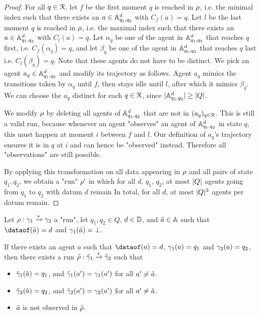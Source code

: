 \begin{proof}
For all $q \in \mathcal{R}$, 
let $f$ be the first moment $q$ is reached in $\rho$, 
i.e. the minimal index such that there exists an $a\in \mathbb{A}^d_{q_1, q_2}$
with $C_f(a)=q$.
Let $l$ be the last moment $q$ is reached in $\rho$, 
i.e. the maximal index such that there exists an $a\in \mathbb{A}^d_{q_1, q_2}$
with $C_l(a)=q$.
Let $\alpha_q$ be one of the agent in $\mathbb{A}^d_{q_1, q_2}$ that reaches $q$ first,
i.e. $C_f(\alpha_q)=q$, and 
let $\beta_q$ be one of the agent in $\mathbb{A}^d_{q_1, q_2}$ that reaches $q$ last
i.e. $C_l(\beta_q)=q$. 
Note that these agents do not have to be distinct.
We pick an agent $a_q \in \mathbb{A}^d_{q_1, q_2}$ and modify its trajectory as follows.
Agent $a_q$ mimics the transitions taken by $\alpha_q$ until $f$, 
then stays idle until $l$, after which it mimics $\beta_q$. 
We can choose the $a_q$ distinct for each $q\in \mathcal{R}$, since $|\mathbb{A}^d_{q_1, q_2}| \geq |Q|$.

We modify $\rho$ by deleting all agents of $\mathbb{A}^d_{q_1, q_2}$ that are not in $(a_q)_{q \in \mathcal{R}}$.
This is still a valid run, because whenever an agent "observes" an agent of $\mathbb{A}^d_{q_1, q_2}$ in state $q$, 
 this must happen at moment $i$ between $f$ and $l$. 
 Our definition of $a_q$'s trajectory ensures it  is in $q$ at $i$ and can hence be "observed" instead. 
 Therefore all "observations" are still possible.
	
By applying this transformation on all data appearing in $\rho$ and all pairs of state $q_1, q_2$, 
we obtain a "run" $\rho'$ in which for all $d$, $q_1$, $q_2$, 
at most $|Q|$ agents going from $q_1$ to $q_2$ with datum $d$ remain 
In total, for all $d$, at most $|Q|^3$ agents per datum remain.
\end{proof}



\begin{lemma}
	\label{lem:agents-copycat}
	Let  $\rho : \gamma_1 \xrightarrow{*} \gamma_2$ a "run", let $q_1, q_2 \in Q$,  $d \in \mathbb{D}$, and  $\Tilde{a} \in \mathbb{A}$ such that $\dataof(\Tilde{a}) = d$ and $\gamma_1(\Tilde{a}) = \bot$. 
	
	If there exists an agent $a$ such that $\dataof(a)=d$, $\gamma_1(a) = q_1$ and $\gamma_2(a) = q_2$, then there exists a run $\Tilde{\rho} : \Tilde{\gamma}_1 \xrightarrow{*} \Tilde{\gamma}_2$ such that
	\begin{itemize}
		\item $\Tilde{\gamma}_1(\Tilde{a}) = q_1$, and $\Tilde{\gamma}_1(a') = \gamma_1(a')$ for all $a' \neq \Tilde{a}$.
		
		\item $\Tilde{\gamma}_2(\Tilde{a}) = q_2$, and $\Tilde{\gamma}_2(a') = \gamma_2(a')$ for all $a' \neq \Tilde{a}$.
		
		\item $\Tilde{a}$ is not observed in $\Tilde{\rho}$.
	\end{itemize}
\end{lemma}

